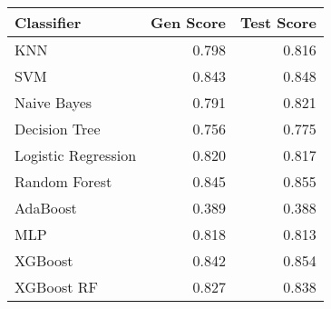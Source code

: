 \begin{tabular}{lrr}
\toprule
Classifier & Gen Score & Test Score \\
\midrule
KNN & 0.798 & 0.816 \\
SVM & 0.843 & 0.848 \\
Naive Bayes & 0.791 & 0.821 \\
Decision Tree & 0.756 & 0.775 \\
Logistic Regression & 0.820 & 0.817 \\
Random Forest & 0.845 & 0.855 \\
AdaBoost & 0.389 & 0.388 \\
MLP & 0.818 & 0.813 \\
XGBoost & 0.842 & 0.854 \\
XGBoost RF & 0.827 & 0.838 \\
\bottomrule
\end{tabular}
